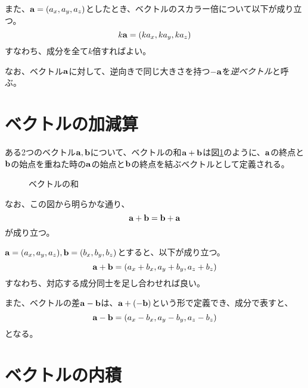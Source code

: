 \documentclass{ltjsreport}
\begin{document}
また、$\vb{a}=(a_x, a_y, a_z)$としたとき、ベクトルのスカラー倍について以下が成り立つ。
\begin{equation}
    k\vb{a} = (ka_x, ka_y, ka_z)
\end{equation}
すなわち、成分を全て$k$倍すればよい。

なお、ベクトル$\vb{a}$に対して、逆向きで同じ大きさを持つ$-\vb{a}$を\emph{逆ベクトル}と呼ぶ。

\section{ベクトルの加減算}

ある2つのベクトル$\vb{a}, \vb{b}$について、ベクトルの和$\vb{a}+\vb{b}$は図\ref{ベクトルの和}のように、$\vb{a}$の終点と$\vb{b}$の始点を重ねた時の$\vb{a}$の始点と$\vb{b}$の終点を結ぶベクトルとして定義される。
\begin{figure}[H]
    \centering
    \caption{ベクトルの和}
    \label{ベクトルの和}
\end{figure}

なお、この図から明らかな通り、
\begin{equation}
    \vb{a}+\vb{b} = \vb{b}+\vb{a}
\end{equation}
が成り立つ。

$\vb{a}=(a_x, a_y, a_z),\vb{b}=(b_x, b_y, b_z)$とすると、以下が成り立つ。
\begin{equation}
    \vb{a}+\vb{b} = (a_x+b_x, a_y+b_y, a_z+b_z)
\end{equation}
すなわち、対応する成分同士を足し合わせれば良い。

また、ベクトルの差$\vb{a}-\vb{b}$は、$\vb{a}+(-\vb{b})$という形で定義でき、成分で表すと、
\begin{equation}
    \vb{a}-\vb{b} = (a_x-b_x, a_y-b_y, a_z-b_z)
\end{equation}
となる。

\section{ベクトルの内積}
\end{document}
